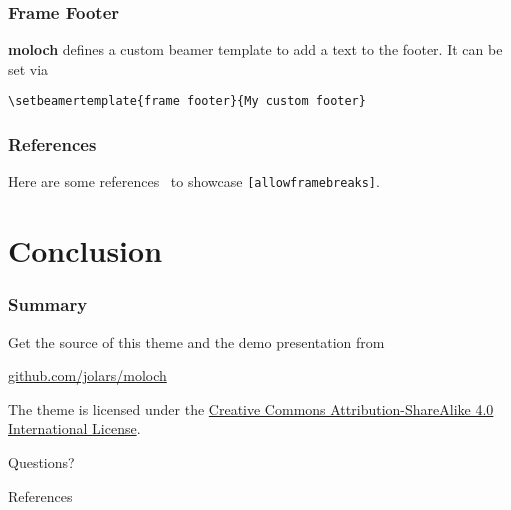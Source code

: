 \documentclass[10pt]{beamer}
\newcommand{\themename}{\textbf{moloch}\xspace}
\begin{document}
{%
\begin{frame}[fragile]
\frametitle{Frame Footer}
  \themename defines a custom beamer template to add a text to the footer. It can be set via
  \begin{verbatim}\setbeamertemplate{frame footer}{My custom footer}\end{verbatim}
\end{frame}
}

\begin{frame}[fragile]
\frametitle{References}
  Here are some references~\cite{Knuth92,ConcreteMath,Simpson,Er01,greenwade93} to showcase \verb+[allowframebreaks]+.
\end{frame}

\section{Conclusion}

\begin{frame}
\frametitle{Summary}

  Get the source of this theme and the demo presentation from
  \begin{center}
    \url{github.com/jolars/moloch}
  \end{center}

  The theme is licensed under the
  \href{http://creativecommons.org/licenses/by-sa/4.0/}{Creative Commons
    Attribution-ShareAlike 4.0 International License}.

  \begin{center}
    \ccbysa
  \end{center}

\end{frame}

\begin{frame}[standout]
  Questions?
\end{frame}

\appendix

\begin{frame}[allowframebreaks]{References}
  
  
\end{frame}
\end{document}
